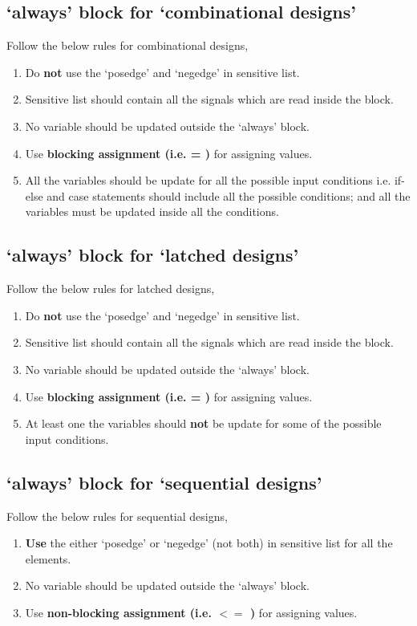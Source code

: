 \subsection{`always' block for `combinational designs'}
Follow the below rules for combinational designs, 
\begin{enumerate}
	\item Do \textbf{not} use the `posedge' and `negedge' in sensitive list. 
	\item Sensitive list should contain all the signals which are read inside the block. 
	\item No variable should be updated outside the `always' block. 
	\item Use \textbf{blocking assignment (i.e. = )} for assigning values. 
	\item All the variables should be update for all the possible input conditions i.e. if-else and case statements should include all the possible conditions; and all the variables must be updated inside all the conditions. 
\end{enumerate}

\subsection{`always' block for `latched designs'}
Follow the below rules for latched designs, 
\begin{enumerate}
	\item Do \textbf{not} use the `posedge' and `negedge' in sensitive list. 
	\item Sensitive list should contain all the signals which are read inside the block. 
	\item No variable should be updated outside the `always' block. 
	\item Use \textbf{blocking assignment (i.e. = )} for assigning values. 
	\item At least one the variables should \textbf{not} be update for some of the possible input conditions.
\end{enumerate}

\subsection{`always' block for `sequential designs'}
Follow the below rules for sequential designs, 
\begin{enumerate}
	\item \textbf{Use} the either `posedge' or `negedge' (not both) in sensitive list for all the elements. 
	\item No variable should be updated outside the `always' block. 
	\item Use \textbf{non-blocking assignment (i.e. $<=$ )} for assigning values. 
\end{enumerate}


